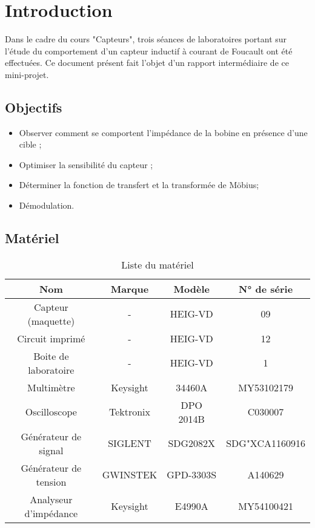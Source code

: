 

\section{Introduction}

Dans le cadre du cours "Capteurs", trois séances de laboratoires portant
sur l'étude du comportement d'un capteur inductif à courant de Foucault ont été effectuées. 
Ce document présent fait l'objet d'un rapport intermédiaire de ce mini-projet.

\subsection{Objectifs}

\begin{itemize}

    \item Observer comment se comportent l'impédance de la bobine en présence d'une cible ;
    \item Optimiser la sensibilité du capteur ;
    \item Déterminer la fonction de transfert et la transformée de Möbius;
    \item Démodulation.
\end{itemize}

\subsection{Matériel}

\begin{table}[H]
    \centering
    \begin{tabular}{|c|c|c|c|}
    \hline
    \textbf{Nom}          & \textbf{Marque} & \textbf{Modèle} & \textbf{N° de série} \\ \hline
    Capteur (maquette)    & -               & HEIG-VD         & 09                   \\ \hline
    Circuit imprimé       & -               & HEIG-VD         & 12                   \\ \hline
    Boite de laboratoire  & -               & HEIG-VD         & 1                    \\ \hline
    Multimètre            & Keysight        & 34460A          & MY53102179           \\ \hline
    Oscilloscope          & Tektronix       & DPO 2014B       & C030007              \\ \hline
    Générateur de signal  & SIGLENT         & SDG2082X        & SDG"XCA1160916       \\ \hline
    Générateur de tension & GWINSTEK        & GPD-3303S       & A140629              \\ \hline
    Analyseur d'impédance & Keysight        & E4990A          & MY54100421           \\ \hline
    \end{tabular}
    \caption{Liste du matériel}
    \end{table}





    

